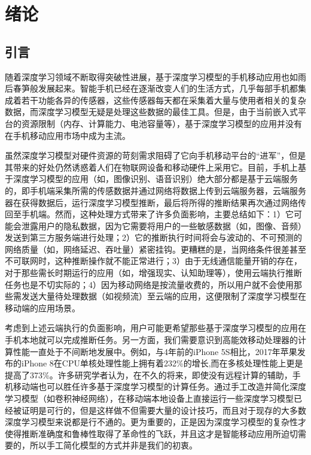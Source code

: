 \chapter{绪论}
\label{chapter:chapter1}
\section{引言}
随着深度学习\cite{lecun2015deep}领域不断取得突破性进展，基于深度学习模型的手机移动应用也如雨后春笋般发展起来。智能手机已经在逐渐改变人们的生活方式，几乎每部手机都集成着若干功能各异的传感器，这些传感器每天都在采集着大量与使用者相关的复杂数据，而深度学习模型无疑是处理这些数据的最佳工具。但是，由于当前嵌入式平台的资源限制（内存、计算能力、电池容量等），基于深度学习模型的应用并没有在手机移动应用市场中成为主流。

虽然深度学习模型对硬件资源的苛刻需求阻碍了它向手机移动平台的“进军”，但是其带来的好处仍然诱惑着人们在物联网设备和移动硬件上采用它。目前，手机上基于深度学习模型的应用（如，图像识别、语音识别）绝大部分都是基于云端服务的，即手机端采集所需的传感数据并通过网络将数据上传到云端服务器，云端服务器在获得数据后，运行深度学习模型推断，最后将所得的推断结果再次通过网络传回至手机端。然而，这种处理方式带来了许多负面影响，主要总结如下：1）它可能会泄露用户的隐私数据，因为它需要将用户的一些敏感数据（如，图像、音频）发送到第三方服务端进行处理；2）它的推断执行时间将会与波动的、不可预测的网络质量（如，网络延迟、吞吐量）紧密挂钩。更糟糕的是，当网络条件很差甚至不可联网时，这种推断操作就不能正常进行；3）由于无线通信能量开销的存在，对于那些需长时期运行的应用（如，增强现实、认知助理等），使用云端执行推断任务也是不切实际的；4）因为移动网络是按流量收费的，所以用户就不会使用那些需发送大量待处理数据（如视频流）至云端的应用，这便限制了深度学习模型在移动端的应用场景。

考虑到上述云端执行的负面影响，用户可能更希望那些基于深度学习模型的应用在手机本地就可以完成推断任务。另一方面，我们需要意识到高能效移动处理器的计算性能一直处于不间断地发展中。例如，与4年前的iPhone 5S相比，2017年苹果发布的iPhone 8在CPU单核处理性能上拥有着232\%的增长,而在多核处理性能上更是提高了373\%。许多研究学者认为，在不久的将来，即使没有远程计算的辅助，手机移动端也可以胜任许多基于深度学习模型的计算任务。通过手工改造并简化深度学习模型（如卷积神经网络\cite{krizhevsky2012imagenet}），在移动端本地设备上直接运行一些深度学习模型已经被证明是可行的，但是这样做不但需要大量的设计技巧，而且对于现存的大多数深度学习模型来说都是行不通的。更为重要的，正是因为深度学习模型的复杂性才使得推断准确度和鲁棒性取得了革命性的飞跃，并且这才是智能移动应用所迫切需要的，所以手工简化模型的方式并非是我们的初衷。

